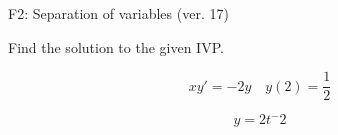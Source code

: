 \begin{exercise}
  \begin{exerciseTitle}F2: Separation of variables (ver. 17)\end{exerciseTitle}
  \begin{exerciseStatement}
    
Find the solution to the given IVP.

    
\[xy'= -2 y \hspace{1em} y( 2 ) = \frac{1}{2}\]

  \end{exerciseStatement}
  \begin{exerciseAnswer}
    
\[y= 2 t^ -2\]

  \end{exerciseAnswer}
\end{exercise}